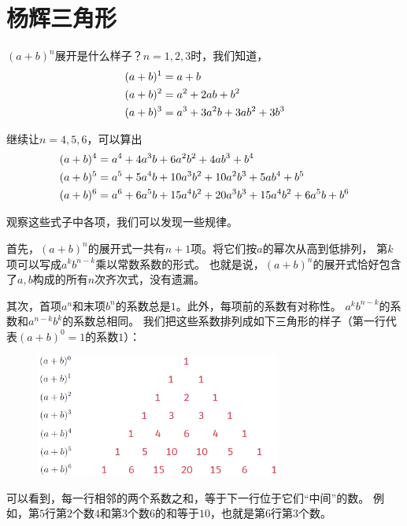 \documentclass[12pt,UTF8]{ctexbook}
\begin{document}
\section{杨辉三角形}

$(a+b)^n$展开是什么样子？$n=1,2,3$时，我们知道，
\begin{align}
 (a + b)^1 &= a + b \notag \\
 (a + b)^2 &= a^2 + 2ab + b^2 \notag \\
 (a + b)^3 &= a^3 + 3a^2b + 3ab^2 + 3b^3 \notag 
\end{align}

继续让$n=4,5,6$，可以算出
\begin{align}
 (a + b)^4 &= a^4 + 4a^3b + 6a^2b^2 + 4ab^3 + b^4 \notag \\
 (a + b)^5 &= a^5 + 5a^4b + 10a^3b^2 + 10a^2b^3 + 5ab^4 + b^5 \notag \\
 (a + b)^6 &= a^6 + 6a^5b + 15a^4b^2 + 20a^3b^3 + 15a^4b^2 + 6a^5b + b^6 \notag 
\end{align}

观察这些式子中各项，我们可以发现一些规律。

首先，$(a+b)^n$的展开式一共有$n+1$项。将它们按$a$的幂次从高到低排列，
第$k$项可以写成$a^kb^{n-k}$乘以常数系数的形式。
也就是说，$(a+b)^n$的展开式恰好包含了$a,b$构成的所有$n$次齐次式，没有遗漏。

其次，首项$a^n$和末项$b^n$的系数总是$1$。此外，每项前的系数有对称性。
$a^kb^{n-k}$的系数和$a^{n-k}b^k$的系数总相同。
我们把这些系数排列成如下三角形的样子（第一行代表$(a+b)^0=1$的系数$1$）：

\begin{figure}[h] %
    \vspace{-14pt}
    \centering
    \includegraphics[width=0.72\textwidth]{二项式1.png}
\end{figure}

可以看到，每一行相邻的两个系数之和，等于下一行位于它们“中间”的数。
例如，第$5$行第$2$个数$4$和第$3$个数$6$的和等于$10$，也就是第$6$行第$3$个数。
\end{document}
